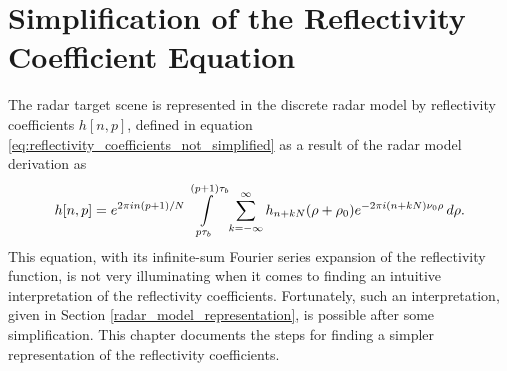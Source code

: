 \chapter[Reflectivity Coefficient Simplification]{Simplification of the Reflectivity Coefficient Equation}
\label{reflectivity_coefficients}
The radar target scene is represented in the discrete radar model by reflectivity coefficients $h[n,p]$, defined in equation \eqref{eq:reflectivity_coefficients_not_simplified} as a result of the radar model derivation as
\begin{equation}\label{eq:reflectivity_coefficients_start}
 h[n,p] = e^{2 \pi i n(p+1)/N} \int\limits_{p\tau_b}^{(p+1)\tau_b} \sum_{k = -\infty}^{\infty} h_{n + kN}(\rho + \rho_0) e^{-2\pi i (n + kN) \nu_0 \rho} \,d\rho.
\end{equation}
This equation, with its infinite-sum Fourier series expansion of the reflectivity function, is not very illuminating when it comes to finding an intuitive interpretation of the reflectivity coefficients. Fortunately, such an interpretation, given in Section \ref{radar_model_representation}, is possible after some simplification. This chapter documents the steps for finding a simpler representation of the reflectivity coefficients.

